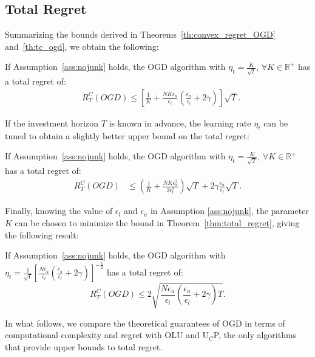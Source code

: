 \subsection{Total Regret}
Summarizing the bounds derived in Theorems~\ref{th:convex_regret_OGD} and~\ref{th:tc_ogd}, we obtain the following:
\begin{theorem} \label{thm:total_regret}
    If Assumption~\ref{ass:nojunk} holds, the OGD algorithm with $\eta_t = \frac{K}{\sqrt{t}}$,  $\forall K \in \mathbb{R}^+$ has a total regret of:
    \begin{align*}
        & R_T^C(OGD) \le \left[ \frac{1}{K} + \frac{NK\epsilon_u}{\epsilon_l}\left( \frac{\epsilon_u}{\epsilon_l} + 2 \gamma \right) \right] \sqrt{T}. %
    \end{align*}
\end{theorem}
If the investment horizon $T$ is known in advance, the learning rate $\eta_t$ can be tuned to obtain a slightly better upper bound on the total regret:
\begin{corollary}\label{cor:OGD_T_known}
   If Assumption~\ref{ass:nojunk} holds, the OGD algorithm with $\eta_t=\frac{K}{\sqrt{T}}$, $\forall K \in \mathbb{R}^+$ has a total regret of:
    \begin{align}\label{eq:OGD_T_known}
    R_T^C(OGD) &\leq \left( \frac{1}{K} + \frac{NK \epsilon_u^2}{2 \epsilon_l^2} \right) \sqrt{T} + 2 \gamma  \frac{\epsilon_u}{\epsilon_l} \sqrt{T}.
    \end{align}
\end{corollary}

Finally, knowing the value of $\epsilon_l$ and $\epsilon_u$ in Assumption \ref{ass:nojunk}, the parameter $K$ can be chosen to minimize the bound in Theorem~\ref{thm:total_regret}, giving the following result:

\begin{corollary} \label{cor:optimal_bound}
    If Assumption~\ref{ass:nojunk} holds, the OGD algorithm with $\eta_t = \frac{1}{\sqrt{t}} \left[ \frac{N \epsilon_u}{\epsilon_l} \left( \frac{\epsilon_u}{\epsilon_l} + 2 \gamma \right) \right]^{-\frac{1}{2}}$ has a total regret of:
    \begin{equation*}
        R_T^C(OGD) \leq 2\sqrt{\frac{N \epsilon_u}{\epsilon_l}\left( \frac{\epsilon_u}{\epsilon_l} + 2 \gamma \right) T}.
    \end{equation*}
\end{corollary}

In what follows, we compare the theoretical guarantees of OGD in terms of computational complexity and regret with OLU and U$_C$P, the only algorithms that provide upper bounds to total regret.

